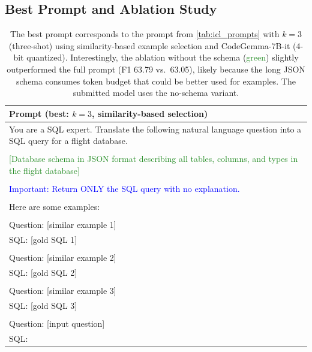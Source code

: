 \documentclass{article}
\begin{document}
\newpage



\subsection{Best Prompt and Ablation Study}

\begin{table}[h!]
\centering
\begin{tabular}{p{13.5cm}}
\toprule
\textbf{Prompt (best: $k{=}3$, similarity-based selection)} \\
\midrule
    You are a SQL expert. Translate the following natural language question into a SQL query for a flight database. \\
    \\
    \textcolor{ForestGreen}{[Database schema in JSON format describing all tables, columns, and types in the flight database]} \\
    \\
    \textcolor{Blue}{Important: Return ONLY the SQL query with no explanation.} \\
    \\
    Here are some examples: \\
    \\
    Question: [similar example 1] \\
    SQL: [gold SQL 1] \\
    \\
    Question: [similar example 2] \\
    SQL: [gold SQL 2] \\
    \\
    Question: [similar example 3] \\
    SQL: [gold SQL 3] \\
    \\
    Question: [input question] \\
    SQL: \\
\bottomrule
\end{tabular}
\caption{The best prompt corresponds to the prompt from \autoref{tab:icl_prompts} with $k = 3$ (three-shot) using similarity-based example selection and CodeGemma-7B-it (4-bit quantized). Interestingly, the ablation without the schema (\textcolor{ForestGreen}{green}) slightly outperformed the full prompt (F1 63.79 vs.\ 63.05), likely because the long JSON schema consumes token budget that could be better used for examples. The submitted model uses the no-schema variant.}
\label{tab:best_prompt}
\end{table}
\end{document}
